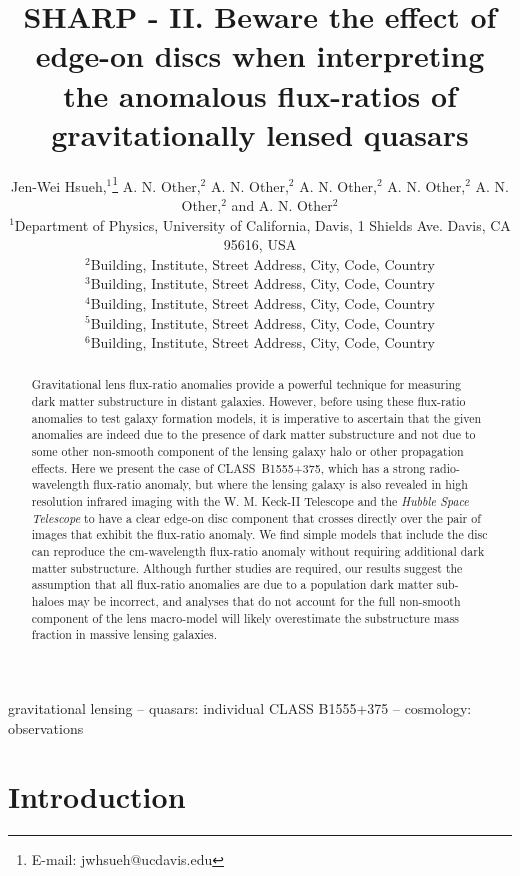 \documentclass[a4paper,fleqn,usenatbib,useAMS]{mnras}
\title[Beware the effect of edge-on discs]{SHARP - II. Beware the effect of edge-on discs when interpreting the anomalous flux-ratios of gravitationally lensed quasars}
\author[Hsueh et al.]{Jen-Wei Hsueh,$^{1}$\thanks{E-mail: jwhsueh@ucdavis.edu} A. N. Other,$^{2}$ A. N. Other,$^{2}$  A. N. Other,$^{2}$ A. N. Other,$^{2}$ A. N. Other,$^{2}$
\newauthor and A. N. Other$^{2}$\\
$^{1}$Department of Physics, University of California, Davis, 1 Shields Ave. Davis, CA 95616, USA\\
$^{2}$Building, Institute, Street Address, City, Code, Country\\
$^{3}$Building, Institute, Street Address, City, Code, Country\\
$^{4}$Building, Institute, Street Address, City, Code, Country\\
$^{5}$Building, Institute, Street Address, City, Code, Country\\
$^{6}$Building, Institute, Street Address, City, Code, Country}
\begin{document}

\pagerange{\pageref{firstpage}--\pageref{lastpage}} 

\maketitle

\label{firstpage}

\begin{abstract}
Gravitational lens flux-ratio anomalies provide a powerful technique for measuring dark matter substructure in distant galaxies. However, before using these flux-ratio anomalies to test galaxy formation models, it is imperative to ascertain that the given anomalies are indeed due to the presence of dark matter substructure and not due to some other non-smooth component of the lensing galaxy halo or other propagation effects. Here we present the case of CLASS~B1555+375, which has a strong radio-wavelength flux-ratio anomaly, but where the lensing galaxy is also revealed in high resolution infrared imaging with the W. M. Keck-II Telescope and the {\it Hubble Space Telescope} to have a clear edge-on disc component that crosses directly over the pair of images that exhibit the flux-ratio anomaly. We find simple models that include the disc can reproduce the cm-wavelength flux-ratio anomaly without requiring additional dark matter substructure. Although further studies are required, our results suggest the assumption that all flux-ratio anomalies are due to a population dark matter sub-haloes may be incorrect, and analyses that do not account for the full non-smooth component of the lens macro-model will likely overestimate the substructure mass fraction in massive lensing galaxies.
\end{abstract}

\begin{keywords}
gravitational lensing -- quasars: individual CLASS B1555+375 -- cosmology: observations 
\end{keywords}

\section{Introduction}
\end{document}
